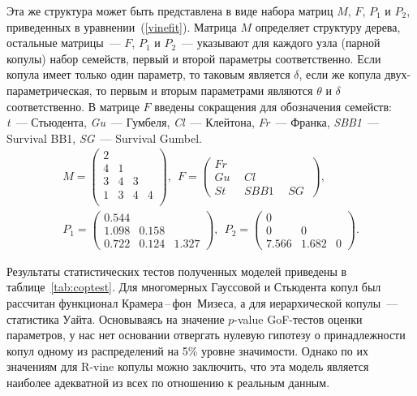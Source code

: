 Эта же структура может быть представлена в виде набора матриц $M$, $F$, $P_1$ и $P_2$, приведенных в уравнении~(\ref{vinefit}). 
Матрица $M$ определяет структуру дерева, остальные матрицы~--- $F$, $P_1$ и $P_2$~--- указывают для каждого узла (парной копулы) набор семейств, первый и второй параметры соответственно. 
Если копула имеет только один параметр, то таковым является $\delta$, если же копула двух-параметрическая, то первым и вторым параметрами являются $\theta$ и $\delta$ соответственно.
В матрице $F$ введены сокращения для обозначения семейств: \textit{t}~--- Стьюдента, \textit{Gu}~--- Гумбеля, \textit{Cl}~--- Клейтона, \textit{Fr}~--- Франка, \textit{SBB1}~--- Survival BB1, \textit{SG}~--- Survival Gumbel.
%
\begin{gather} \label{vinefit}
    M = \left(
        \begin{array}{cccc}
        2 &   &   &   \\
        4 & 1 &   &   \\
        3 & 4 & 3 &   \\
        1 & 3 & 4 & 4 \\
        \end{array} \right), \ \
    F = \left(
        \begin{array}{lll}%
        \textit{Fr}\ &\  &    \\
        \textit{Gu}\ &\ \textit{Cl}\   &   \\
        \textit{St}\ &\ \textit{SBB1}\ &\ \textit{SG}\
        \end{array} \right),\\    
    P_1 = \left(
        \begin{array}{ccc}
        0.544 & & \\
        1.098 & 0.158 & \\
        0.722 & 0.124 & 1.327
        \end{array} \right), \ \
    P_2 = \left(
        \begin{array}{ccc}
        0 &  & \\
        0 & 0 & \\
        7.566 & 1.682 & 0
        \end{array} \right). \nonumber
\end{gather}

Результаты статистических тестов полученных моделей приведены в таблице~\ref{tab:coptest}.
Для многомерных Гауссовой и Стьюдента копул был рассчитан функционал Крамера\,--\,фон~Мизеса, а для иерархической копулы~--- статистика Уайта.
Основываясь на значение $p$-value GoF-тестов оценки параметров, у нас нет основании отвергать нулевую гипотезу о принадлежности копул одному из распределений на 5\% уровне значимости.
Однако по их значениям для R-vine копулы можно заключить, что эта модель является наиболее адекватной из всех по отношению к реальным данным.

